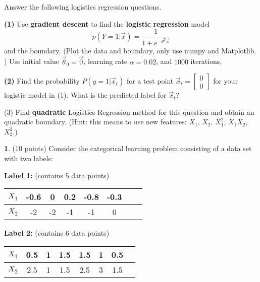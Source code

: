 \documentclass[11pt]{paper}
\theoremstyle{definition}
\newtheorem{Question}[theorem]{ }
\newcommand{\Qu}[1]{
\begin{Question}
#1
\end{Question}
\vspace{-0.5cm}
}
\newcommand{\vx}{\vec{x}}
\begin{document}
Answer the following logistics regression questions.  

 
 
  
\textbf{(1)} Use \textbf{gradient descent} to find the \textbf{logistic} \textbf{regression} model   $$p(Y=1 | \vx )=\dfrac{1}{1+e^{-\theta^T \vx}} $$ and the boundary.  (Plot the data and boundary, only use numpy  and Matplotlib. )  Use initial value $\vec{\theta}_0=\vec{0}$,  learning rate $\alpha=0.02$, and   $1000$ iterations, 

 \vfill
 
 
\textbf{(2)} Find the probability $P(y=1 | \vx_t)$ for a test point $\vx_t=\begin{bmatrix}
0\\
0
\end{bmatrix}
$ for your logistic model in (1). What is the predicted label for $\vx_t$?
 
\vfill



 
 (3)   Find \textbf{quadratic} Logistics Regression method for this question and obtain an quadratic boundary.   (Hint: this means to use new features:  $X_1$,  $X_2$,  $X_1^2$, $X_1X_2$, $X_2^2$.)
 
 
\vfill
 
 \newpage


 
\Qu{(10 points) Consider the categorical learning problem consisting of a data set with two labels:
 
 
 
 \textbf{Label 1: } (contains 5 data  points)
 
 
\begin{tabular}{c|c|c|c|c|c|c|c}
 $X_1$   & -0.6 &    0 &0.2 &-0.8 &-0.3 \\ \hline
 $X_2$   &  -2&  -2  &-1 & -1 & 0 \\
\end{tabular} 
 
 
\textbf{Label 2: } (contains 6 data  points)
 
\begin{tabular}{c|c|c|c|c|c|c|c}
 $X_1$    & 0.5  & 1 &1.5 & 1.5 & 1  & 0.5     \\ \hline
 $X_2$    &  2.5 & 1  & 1.5 & 2.5 &3   &1.5  \\
\end{tabular}
 
  
 }
 
\end{document}
